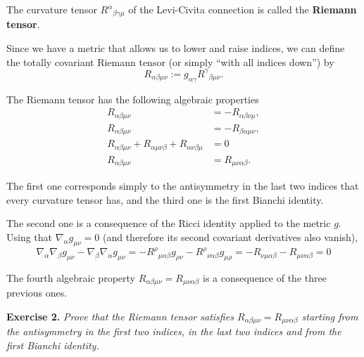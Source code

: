 \begin{points}
\item The curvature tensor $R^\alpha{}_{\beta\gamma\mu}$ of the Levi-Civita connection is called the \textbf{Riemann tensor}.

\item Since we have a metric that allows us to lower and raise indices, we can define the totally covariant Riemann tensor (or simply ``with all indices down'') by
\[
  R_{\alpha\beta\mu\nu}:=g_{\alpha\gamma}R^\gamma{}_{\beta\mu\nu} .
\]

\item The Riemann tensor has the following algebraic properties
\begin{align*}
  R_{\alpha\beta\mu\nu}&=-R_{\alpha\beta\nu\mu},\\
  R_{\alpha\beta\mu\nu}&=-R_{\beta\alpha\mu\nu},\\
  R_{\alpha\beta\mu\nu}+R_{\alpha\mu\nu\beta}+R_{\alpha\nu\beta\mu}&=0\\
  R_{\alpha\beta\mu\nu}&=R_{\mu\nu\alpha\beta}.
\end{align*}

\item The first one corresponds simply to the antisymmetry in the last two indices that every curvature tensor has, and the third one is the first Bianchi identity.

\item The second one is a consequence of the Ricci identity applied to the metric $g$. Using that $\nabla_\alpha g_{\mu\nu}=0$ (and therefore its second covariant derivatives also vanish),
\[
  \nabla_\alpha\nabla_\beta g_{\mu\nu}-\nabla_\beta\nabla_\alpha g_{\mu\nu}=-R^\rho{}_{\mu\alpha\beta}g_{\rho\nu}-R^\rho{}_{\nu\alpha\beta}g_{\mu\rho}=-R_{\nu\mu\alpha\beta}-R_{\mu\nu\alpha\beta}=0
\]

\item The fourth algebraic property $R_{\alpha\beta\mu\nu}=R_{\mu\nu\alpha\beta}$ is a consequence of the three previous ones.
\end{points}

\textbf{Exercise 2.} \emph{Prove that the Riemann tensor satisfies $R_{\alpha\beta\mu\nu}=R_{\mu\nu\alpha\beta}$ starting from the antisymmetry in the first two indices, in the last two indices and from the first Bianchi identity.}


